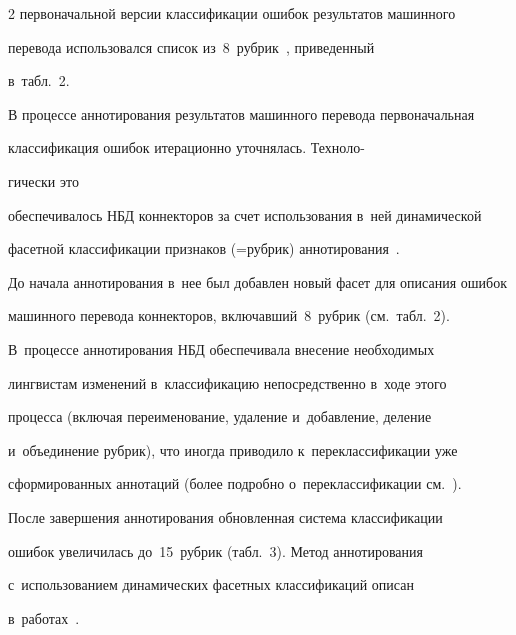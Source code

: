 \begin{multicols}{2}
первоначальной версии классификации ошибок результатов машинного 


перевода использовался список из~8~руб\-рик~\cite{16-gz}, приведенный 


в~табл.~2.








  В процессе аннотирования результатов машинного перевода первоначальная 


классификация ошибок итерационно уточнялась. Техноло-\linebreak





\columnbreak





\noindent


гически это 


обеспечивалось НБД коннекторов за счет использования в~ней динамической 


фасетной классификации признаков (=\;рубрик) аннотирования~\cite{17-gz, 18-gz, 19-gz}. 


До  начала аннотирования в~нее был добавлен новый фасет для описания ошибок 


машинного перевода коннекторов, включавший~8~руб\-рик (см.\ табл.~2). 


В~процессе аннотирования НБД обеспечивала внесение необходимых 


лингвистам изменений в~классификацию непосредственно в~ходе этого 


процесса (включая переименование, удаление и~добавление, деление 


и~объединение руб\-рик), что иногда приводило к~переклассификации уже 


сформированных аннотаций (более подробно о~переклассификации см.~\cite{20-gz}).


  


  После завершения аннотирования обновленная система классификации 


ошибок увеличилась до~15~рубрик (табл.~3). Метод аннотирования 


с~использованием динамических фасетных классификаций описан 


в~работах~\cite{17-gz, 19-gz, 21-gz}.









\end{multicols}
